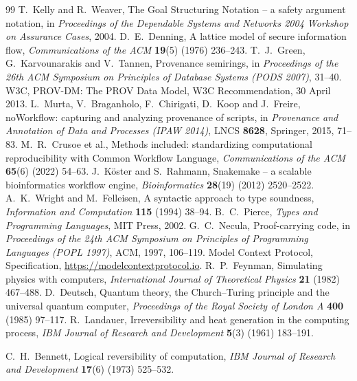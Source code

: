 \begin{thebibliography}{99}
 T.~Kelly and R.~Weaver, The Goal Structuring Notation -- a safety argument notation, in \emph{Proceedings of the Dependable
Systems and Networks 2004 Workshop on Assurance Cases}, 2004.
 D.~E.~Denning, A lattice model of secure information flow, \emph{Communications of the ACM} \textbf{19}(5) (1976)
236--243.
 T.~J.~Green, G.~Karvounarakis and V.~Tannen, Provenance semirings, in \emph{Proceedings of the 26th ACM Symposium on
Principles of Database Systems (PODS 2007)}, 31--40.
 W3C, PROV-DM: The PROV Data Model, W3C Recommendation, 30 April 2013.
 L.~Murta, V.~Braganholo, F.~Chirigati, D.~Koop and J.~Freire, noWorkflow: capturing and analyzing provenance of
scripts, in \emph{Provenance and Annotation of Data and Processes (IPAW 2014)}, LNCS \textbf{8628}, Springer, 2015, 71--83.
 M.~R.~Crusoe et al., Methods included: standardizing computational reproducibility with Common Workflow Language,
\emph{Communications of the ACM} \textbf{65}(6) (2022) 54--63.
 J.~K\"oster and S.~Rahmann, Snakemake -- a scalable bioinformatics workflow engine, \emph{Bioinformatics}
\textbf{28}(19) (2012) 2520--2522.
 A.~K.~Wright and M.~Felleisen, A syntactic approach to type soundness, \emph{Information and Computation} \textbf{115}
(1994) 38--94.
 B.~C.~Pierce, \emph{Types and Programming Languages}, MIT Press, 2002.
 G.~C.~Necula, Proof-carrying code, in \emph{Proceedings of the 24th ACM Symposium on Principles of Programming
Languages (POPL 1997)}, ACM, 1997, 106--119.
 Model Context Protocol, Specification, \url{https://modelcontextprotocol.io}.
 R.~P.~Feynman, Simulating physics with computers, \emph{International Journal of Theoretical Physics} \textbf{21}
(1982) 467--488.
 D.~Deutsch, Quantum theory, the Church--Turing principle and the universal quantum computer, \emph{Proceedings of
the Royal Society of London A} \textbf{400} (1985) 97--117.
 R.~Landauer, Irreversibility and heat generation in the computing process, \emph{IBM Journal of Research and
Development} \textbf{5}(3) (1961) 183--191.

 C.~H.~Bennett, Logical reversibility of computation, \emph{IBM Journal of Research and Development} \textbf{17}(6)
(1973) 525--532.
\end{thebibliography}
\endgroup
